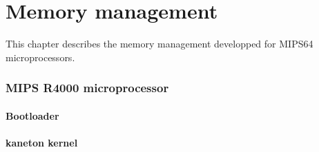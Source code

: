 %
%
%
%
%
%

%
%

\chapter{Memory management}

This chapter describes the memory management developped for MIPS64 microprocessors.

\subsection{MIPS R4000 microprocessor}

\subsubsection{Bootloader}

\subsubsection{kaneton kernel}
